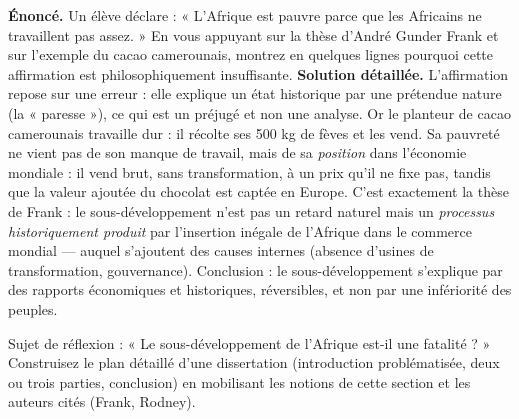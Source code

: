 \documentclass[11pt]{article}
\begin{document}
\begin{exoresolu}
\textbf{Énoncé.} Un élève déclare : « L'Afrique est pauvre parce que les Africains ne travaillent pas assez. » En vous appuyant sur la thèse d'André Gunder Frank et sur l'exemple du cacao camerounais, montrez en quelques lignes pourquoi cette affirmation est philosophiquement insuffisante.
\tcblower
\textbf{Solution détaillée.} L'affirmation repose sur une erreur : elle explique un état historique par une prétendue nature (la « paresse »), ce qui est un préjugé et non une analyse. Or le planteur de cacao camerounais travaille dur : il récolte ses 500 kg de fèves et les vend. Sa pauvreté ne vient pas de son manque de travail, mais de sa \emph{position} dans l'économie mondiale : il vend brut, sans transformation, à un prix qu'il ne fixe pas, tandis que la valeur ajoutée du chocolat est captée en Europe. C'est exactement la thèse de Frank : le sous-développement n'est pas un retard naturel mais un \emph{processus historiquement produit} par l'insertion inégale de l'Afrique dans le commerce mondial — auquel s'ajoutent des causes internes (absence d'usines de transformation, gouvernance). Conclusion : le sous-développement s'explique par des rapports économiques et historiques, réversibles, et non par une infériorité des peuples.
\end{exoresolu}

\begin{exercice}
Sujet de réflexion : « Le sous-développement de l'Afrique est-il une fatalité ? » Construisez le plan détaillé d'une dissertation (introduction problématisée, deux ou trois parties, conclusion) en mobilisant les notions de cette section et les auteurs cités (Frank, Rodney).
\end{exercice}
\end{document}
